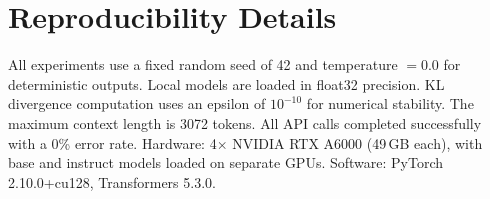 \section{Reproducibility Details}
\label{app:reproducibility}

All experiments use a fixed random seed of 42 and temperature $= 0.0$ for deterministic outputs. Local models are loaded in float32 precision. KL divergence computation uses an epsilon of $10^{-10}$ for numerical stability. The maximum context length is 3072 tokens. All API calls completed successfully with a 0\% error rate. Hardware: 4$\times$ NVIDIA RTX A6000 (49\,GB each), with base and instruct models loaded on separate GPUs. Software: PyTorch 2.10.0+cu128, Transformers 5.3.0.
